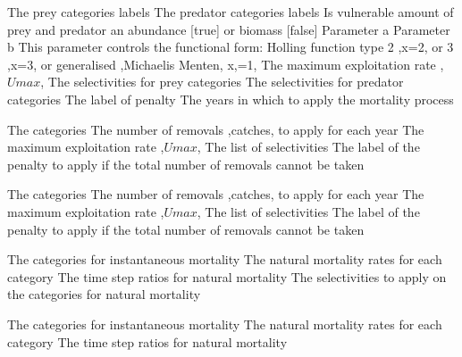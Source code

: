 \par\textbf{}\par
{} {The prey categories labels}
 {The predator categories labels}
 {Is vulnerable amount of prey and predator an abundance [true] or biomass [false]}
 {Parameter a}
 {Parameter b}
 {This parameter controls the functional form: Holling function type 2 ,x=2, or 3 ,x=3, or generalised ,Michaelis Menten, x,=1,}
 {The maximum exploitation rate ,$Umax$,}
 {The selectivities for prey categories}
 {The selectivities for predator categories}
 {The label of penalty}
 {The years in which to apply the mortality process}
\par\textbf{}\par
{} {The categories}
 {The number of removals ,catches, to apply for each year}
 {The maximum exploitation rate ,$Umax$,}
 {The list of selectivities}
 {The label of the penalty to apply if the total number of removals cannot be taken}
\par\textbf{}\par
{} {The categories}
 {The number of removals ,catches, to apply for each year}
 {The maximum exploitation rate ,$Umax$,}
 {The list of selectivities}
 {The label of the penalty to apply if the total number of removals cannot be taken}
\par\textbf{}\par
{} {The categories for instantaneous mortality}
 {The natural mortality rates for each category}
 {The time step ratios for natural mortality}
 {The selectivities to apply on the categories for natural mortality}
\par\textbf{}\par
{} {The categories for instantaneous mortality}
 {The natural mortality rates for each category}
 {The time step ratios for natural mortality}
